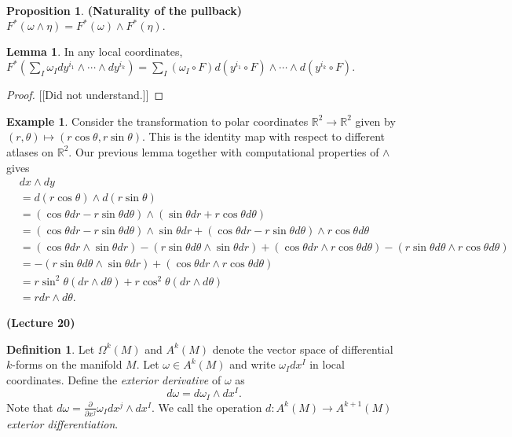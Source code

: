 \documentclass[10pt,letterpaper,cm]{nupset}
\theoremstyle{definition}
\newtheorem*{definition}{Definition}
\newtheorem{exmp}{Example}
\newtheorem{lemma}{Lemma}
\newtheorem{prop}{Proposition}
\newcommand{\R}{\mathbb R}
\newcommand{\1}{\mathbf{1}}
\newcommand{\0}{\vec 0}
\begin{document}
\begin{prop}{\textbf{(Naturality of the pullback)}}
$F^{\ast}(\omega \wedge \eta) = F^{\ast}(\omega) \wedge F^{\ast}(\eta).$
\end{prop}

\begin{lemma}
In any local coordinates, $F^{\ast}(\sum_I \omega_I dy^{i_1} \wedge \cdots \wedge dy^{i_k}) = \sum_I (\omega_I \circ F)d(y^{i_1} \circ F) \wedge \cdots \wedge d(y^{i_k} \circ F).$
\end{lemma}
\begin{proof}
{[[Did not understand.]]}
\end{proof}

\begin{exmp}
Consider the transformation to polar coordinates $\R^2 \to \R^2$ given by $(r, \theta) \mapsto (r\cos \theta, r\sin \theta)$. This is the identity map with respect to different atlases on $\R^2$. Our previous lemma together with computational properties of $\wedge$ gives
\begin{align*} & dx \wedge dy \\ & = d(r\cos \theta) \wedge d(r\sin \theta) \\ &=   (\cos \theta dr - r\sin \theta d\theta) \wedge (\sin \theta dr +r \cos \theta d\theta) \\ &= (\cos \theta dr - r\sin \theta d\theta) \wedge \sin \theta dr + (\cos \theta dr - r\sin \theta d\theta) \wedge r \cos \theta d\theta \\ & = (\cos \theta dr \wedge \sin \theta dr) - (r \sin \theta d \theta \wedge \sin \theta dr) +  (\cos \theta dr \wedge r \cos \theta d\theta) - (r\sin \theta d \theta \wedge r \cos \theta d \theta)\\ & =  - (r \sin \theta d \theta \wedge \sin \theta dr) +  (\cos \theta dr \wedge r \cos \theta d\theta) \\ & = r\sin^2\theta(dr \wedge d\theta) + r\cos^2 \theta(dr \wedge d\theta)\\ & = rdr \wedge d\theta.
\end{align*}
\end{exmp}

\begin{center}
{\textbf{(Lecture 20)}} 
\end{center}

\begin{definition}
Let $\Omega^k(M)$ and $A^k(M)$ denote the vector space of differential $k$-forms on the manifold $M$. 
Let $\omega \in A^k(M)$ and write $\omega_I dx^I$ in local coordinates. Define the \textit{exterior derivative} of $\omega$ as $$d\omega = d \omega_I \wedge dx^I.$$ Note that $d \omega = \frac{\partial}{\partial{x^j}}\omega_I dx^j \wedge dx^I.$ We call the operation $d : A^k(M) \to A^{k+1}(M)$ \textit{exterior differentiation}.
\end{definition}
\end{document}
